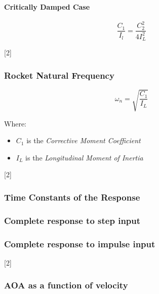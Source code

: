 \documentclass[]{article}
\providecommand{\tightlist}{%
  \setlength{\itemsep}{0pt}\setlength{\parskip}{0pt}}
\let\oldparagraph\paragraph
\renewcommand{\paragraph}[1]{\oldparagraph{#1}\mbox{}}
\begin{document}
\paragraph{Critically Damped Case}\label{critically-damped-case}

\begin{equation}
\dfrac{C_1}{I_l} = \dfrac{C_2^2}{4I_L^2}
\end{equation}

{[}2{]}

\subsubsection{Rocket Natural Frequency}\label{rocket-natural-frequency}

\begin{equation}
\label{rocket_natrual_frequency}
\omega_n = \sqrt{\dfrac{C_1}{I_L}}
\end{equation}

Where:

\begin{itemize}
\tightlist
\item
  \(C_1\) is the \emph{Corrective Moment Coefficient}
\item
  \(I_L\) is the \emph{Longitudinal Moment of Inertia}
\end{itemize}

{[}2{]}

\subsubsection{Time Constants of the
Response}\label{time-constants-of-the-response}

\subsubsection{Complete response to step
input}\label{complete-response-to-step-input-1}

\subsubsection{Complete response to impulse
input}\label{complete-response-to-impulse-input-1}

{[}2{]}

\subsubsection{AOA as a function of
velocity}\label{aoa-as-a-function-of-velocity}
\end{document}
